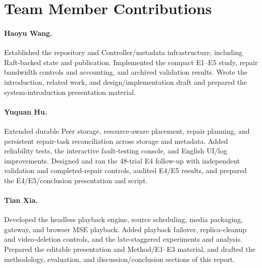 \section{Team Member Contributions}
\paragraph{Haoyu Wang.}
Established the repository and Controller/metadata infrastructure, including
Raft-backed state and publication. Implemented the compact E1--E5 study,
repair bandwidth controls and accounting, and archived validation results.
Wrote the introduction, related work, and design/implementation draft and
prepared the system-introduction presentation material.

\paragraph{Yuquan Hu.}
Extended durable Peer storage, resource-aware placement, repair planning,
and persistent repair-task reconciliation across storage and metadata.
Added reliability tests, the interactive fault-testing console, and English
UI/log improvements. Designed and ran the 48-trial E4 follow-up with
independent validation and completed-repair controls, audited E4/E5 results,
and prepared the E4/E5/conclusion presentation and script.

\paragraph{Tian Xia.}
Developed the headless playback engine, source scheduling, media packaging,
gateway, and browser MSE playback. Added playback failover, replica-cleanup
and video-deletion controls, and the late-staggered experiments and analysis.
Prepared the editable presentation and Method/E1--E3 material, and drafted
the methodology, evaluation, and discussion/conclusion sections of this
report.
